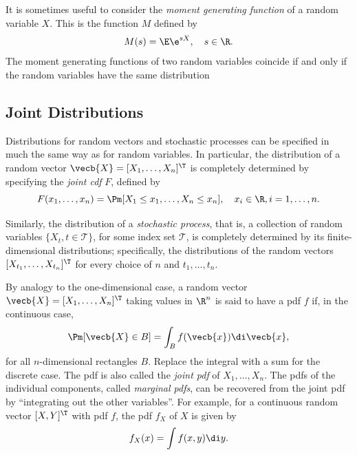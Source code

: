 It is sometimes useful to consider the \textit{moment generating function} of a random variable \(X\). This is the function \(M\) defined by
\begin{equation}M(s) = \E\e^{sX}, \quad s \in \R. \label{eq:MomentGeneratingFunction}
\end{equation}
The moment generating functions of two random variables coincide if and only if the random variables have the same distribution

\subsection{Joint Distributions}
Distributions for random vectors and stochastic processes can be specified in much the same way as for random variables. In particular, the distribution of a random vector \(\vecb{X} = [X_1, \dots, X_n]^\T\) is completely determined by specifying the \textit{joint cdf} \(F\), defined by
\begin{equation*}
	F(x_1, \dots, x_n) = \Pm[X_1 \le x_1, \dots, X_n \le x_n], \quad x_i \in \R, i = 1, \dots, n.
\end{equation*}

Similarly, the distribution of a \textit{stochastic process}, that is, a collection of random variables \(\{X_t, t \in \mathcal{T}\}\), for some index set \(\mathcal{T}\), is completely determined by its finite-dimensional distributions; specifically, the distributions of the random vectors \([X_{t_1}, \dots, X_{t_n}]^\T\) for every choice of \(n\) and \(t_1, \dots, t_n\).

By analogy to the one-dimensional case, a random vector \(\vecb{X} = [X_1, \dots, X_n]^\T\) taking values in \(\R^n\) is said to have a pdf \(f\) if, in the continuous case,
\begin{equation}
	\Pm[\vecb{X} \in B] = \int_B f(\vecb{x}) \di \vecb{x}, \label{eq:JointProbContinuous}
\end{equation}
for all \(n\)-dimensional rectangles \(B\). Replace the integral with a sum for the discrete case. The pdf is also called the \textit{joint pdf} of \(X_1, \dots, X_n\). The pdfs of the individual components, called \textit{marginal pdfs}, can be recovered from the joint pdf by ``integrating out the other variables''. For example, for a continuous random vector \([X, Y]^\T\) with pdf \(f\), the pdf \(f_X\) of \(X\) is given by
\begin{equation*}
	f_X(x) = \int f(x, y) \di y.
\end{equation*}

